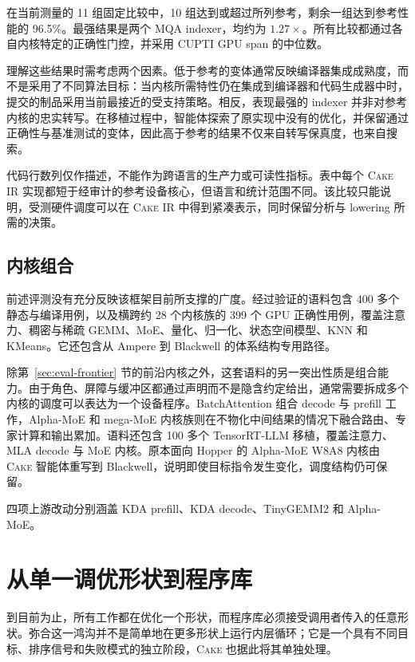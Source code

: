 \documentclass[10pt]{article}
\newcommand{\cake}{\textsc{Cake}}
\newcommand{\cakeir}{\textsc{Cake IR}}
\begin{document}
在当前测量的 11 组固定比较中，10 组达到或超过所列参考，剩余一组达到参考性能的 96.5\%。最强结果是两个 MQA indexer，均约为 $1.27\times$。所有比较都通过各自内核特定的正确性门控，并采用 CUPTI GPU span 的中位数。

理解这些结果时需考虑两个因素。低于参考的变体通常反映编译器集成成熟度，而不是采用了不同算法目标：当内核所需特性仍在集成到编译器和代码生成器中时，提交的制品采用当前最接近的受支持策略。相反，表现最强的 indexer 并非对参考内核的忠实转写。在移植过程中，智能体探索了原实现中没有的优化，并保留通过正确性与基准测试的变体，因此高于参考的结果不仅来自转写保真度，也来自搜索。

代码行数列仅作描述，不能作为跨语言的生产力或可读性指标。表中每个 \cakeir{} 实现都短于经审计的参考设备核心，但语言和统计范围不同。该比较只能说明，受测硬件调度可以在 \cakeir{} 中得到紧凑表示，同时保留分析与 lowering 所需的决策。

\subsection{内核组合}
\label{sec:eval-portfolio}

前述评测没有充分反映该框架目前所支撑的广度。经过验证的语料包含 400 多个静态与编译用例，以及横跨约 28 个内核族的 399 个 GPU 正确性用例，覆盖注意力、稠密与稀疏 GEMM、MoE、量化、归一化、状态空间模型、KNN 和 KMeans。它还包含从 Ampere 到 Blackwell 的体系结构专用路径。

除第~\ref{sec:eval-frontier} 节的前沿内核之外，这套语料的另一突出性质是组合能力。由于角色、屏障与缓冲区都通过声明而不是隐含约定给出，通常需要拆成多个内核的调度可以表达为一个设备程序。BatchAttention 组合 decode 与 prefill 工作，Alpha-MoE 和 mega-MoE 内核族则在不物化中间结果的情况下融合路由、专家计算和输出累加。语料还包含 100 多个 TensorRT-LLM 移植，覆盖注意力、MLA decode 与 MoE 内核。原本面向 Hopper 的 Alpha-MoE W8A8 内核由 \cake{} 智能体重写到 Blackwell，说明即使目标指令发生变化，调度结构仍可保留。

四项上游改动分别涵盖 KDA prefill、KDA decode、TinyGEMM2 和 Alpha-MoE。

\section{从单一调优形状到程序库}
\label{sec:generalization}

到目前为止，所有工作都在优化一个形状，而程序库必须接受调用者传入的任意形状。弥合这一鸿沟并不是简单地在更多形状上运行内层循环；它是一个具有不同目标、排序信号和失败模式的独立阶段，\cake{} 也据此将其单独处理。
\end{document}
